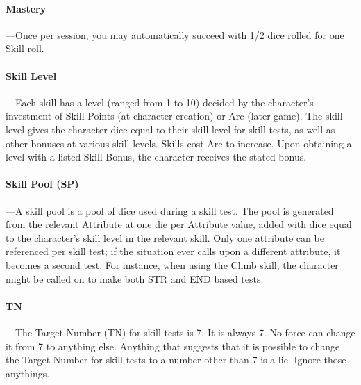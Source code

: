 \documentclass[oneside,11pt,english]{book}
\begin{document}
\paragraph{\label{par:Mastery}Mastery}
---\quad Once per session, you may automatically succeed with 1/2 dice rolled for one Skill roll.
\paragraph{\label{par:Skill Level}Skill Level}
---\quad Each skill has a level (ranged from 1 to 10) decided by the character’s
investment of Skill Points (at character creation) or Arc (later game). The
skill level gives the character dice equal to their skill level for skill tests,
as well as other bonuses at various skill levels. Skills cost Arc to increase.
Upon obtaining a level with a listed Skill Bonus, the character receives the
stated bonus. 
\paragraph{\label{par:Skill Pool}Skill Pool (SP)}
---\quad A skill pool is a pool of dice used during a skill test. The pool is
generated from the relevant Attribute at one die per Attribute value, added with
dice equal to the character’s skill level in the relevant skill. Only one
attribute can be referenced per skill test; if the situation ever calls upon a
different attribute, it becomes a second test. For instance, when using the
Climb skill, the character might be called on to make both STR and END based
tests. 
\paragraph{\label{par:TN}TN}
---\quad The Target Number (TN) for skill tests is 7. It is always 7. No force
can change it from 7 to anything else. Anything that suggests that it is
possible to change the Target Number for skill tests to a number other than 7 is
a lie. Ignore those anythings. 
\end{document}
